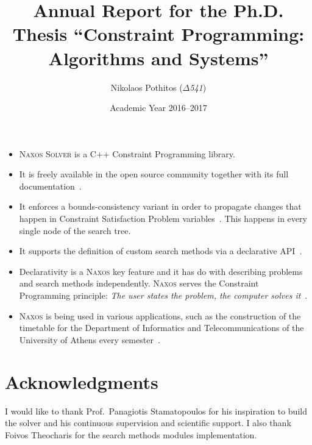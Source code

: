 \documentclass[a4paper]{article}
\begin{document}
\title{Annual Report for the Ph.D. Thesis ``Constraint Programming: Algorithms and Systems''}

\author{Nikolaos Pothitos ($\Delta$\emph{541})}


\date{Academic Year 2016--2017}

\maketitle

\begin{itemize}
  \item \textsc{Naxos Solver} is a C++ Constraint
        Programming library.
  \item It is freely available in the open source community
        together with its full documentation~\cite{Naxos}.
  \item It enforces a bounds-consistency variant in order to
        propagate changes that happen in Constraint
        Satisfaction Problem variables~\cite{Bessiere2006}.
        This happens in every single node of the search
        tree.
  \item It supports the definition of custom search methods
        via a declarative API~\cite{Pothitos2017}.
  \item Declarativity is a \textsc{Naxos} key feature and it
        has do with describing problems and search methods
        independently. \textsc{Naxos} serves the Constraint
        Programming principle: \emph{The user states the
        problem, the computer solves it}~\cite{Freuder2014}.
  \item \textsc{Naxos} is being used in various
        applications, such as the construction of the
        timetable for the Department of Informatics and
        Telecommunications of the University of Athens every
        semester~\cite{Pothitos2012-Scheduling}.
\end{itemize}

\section*{Acknowledgments}

I would like to thank Prof.~Panagiotis Stamatopoulos for his
inspiration to build the solver and his continuous
supervision and scientific support. I also thank Foivos
Theocharis for the search methods modules implementation.



\end{document}
